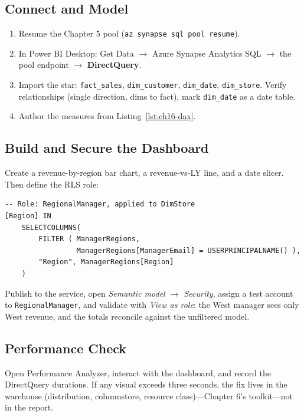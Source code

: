 \subsection{Connect and Model}
\begin{enumerate}
    \item Resume the Chapter 5 pool (\texttt{az synapse sql pool resume}).
    \item In Power BI Desktop: Get Data $\rightarrow$ Azure Synapse Analytics SQL $\rightarrow$ the pool endpoint $\rightarrow$ \textbf{DirectQuery}.
    \item Import the star: \texttt{fact\_sales}, \texttt{dim\_customer}, \texttt{dim\_date}, \texttt{dim\_store}. Verify relationships (single direction, dims to fact), mark \texttt{dim\_date} as a date table.
    \item Author the measures from Listing~\ref{lst:ch16-dax}.
\end{enumerate}

\subsection{Build and Secure the Dashboard}
Create a revenue-by-region bar chart, a revenue-vs-LY line, and a date slicer. Then define the RLS role:

\begin{lstlisting}[language={},caption={Dynamic RLS role filtering stores through the manager mapping table.},label={lst:ch16-rls}]
-- Role: RegionalManager, applied to DimStore
[Region] IN
    SELECTCOLUMNS(
        FILTER ( ManagerRegions,
                 ManagerRegions[ManagerEmail] = USERPRINCIPALNAME() ),
        "Region", ManagerRegions[Region]
    )
\end{lstlisting}

Publish to the service, open \emph{Semantic model $\rightarrow$ Security}, assign a test account to \texttt{RegionalManager}, and validate with \emph{View as role}: the West manager sees only West revenue, and the totals reconcile against the unfiltered model.

\subsection{Performance Check}
Open Performance Analyzer, interact with the dashboard, and record the DirectQuery durations. If any visual exceeds three seconds, the fix lives in the warehouse (distribution, columnstore, resource class)---Chapter 6's toolkit---not in the report.

